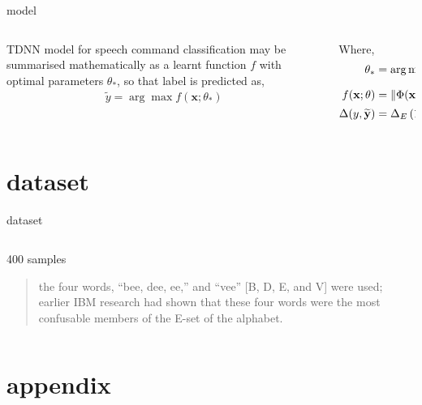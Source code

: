 \documentclass[aspectratio=169,xcolor={dvipsnames,svgnames}]{beamer}
\begin{document}
\begin{frame}[label={sec:org4100825}]{model}
\begin{columns}
\begin{column}{.5\columnwidth}
TDNN model for speech command classification may be
summarised mathematically as a learnt function \(f\) with
optimal parameters \(\theta_*\), so that label is
predicted as,
\begin{align*}
\widetilde{y} = \arg\max f(\mathbf{x};\theta_*)
\end{align*}
\end{column}

\begin{column}{.5\columnwidth}
Where, 
\begin{align}
  \notag \theta_*
  &= \arg \min_{\theta} \underset {y,\mathbf{x}
    \sim\text{data}} {\mathbb{E}} \left[ \Delta(y,
    f(\mathbf{x};\theta)) \right] \\
  \notag f(\mathbf{x};\theta)
  &= \left\| \Phi(\mathbf{x};
    \theta) \right\|_{2,\mathrm{row}}^2 \\
  \notag \Delta(y, \widetilde{\mathbf{y}})
  &= \Delta_E \left(\boldsymbol{1}_K(y),
    \widetilde{\mathbf{y}} \right)
\end{align}
\end{column}
\end{columns}
\end{frame}

\section{dataset}
\label{sec:org3c26869}
\begin{frame}[label={sec:dataset}]{dataset}
\begin{columns}
\begin{column}{0.5\columnwidth}
400 samples

\begin{quote}
the four \alert{words}, ``bee, dee, ee,'' and ``vee'' [B, D, E,
and V] were used; earlier IBM research had shown that
these four words were the most confusable members of
the E-set of the alphabet.
\end{quote}
\end{column}
\end{columns}
\end{frame}

\section{appendix}
\label{sec:appendix}
\end{document}
